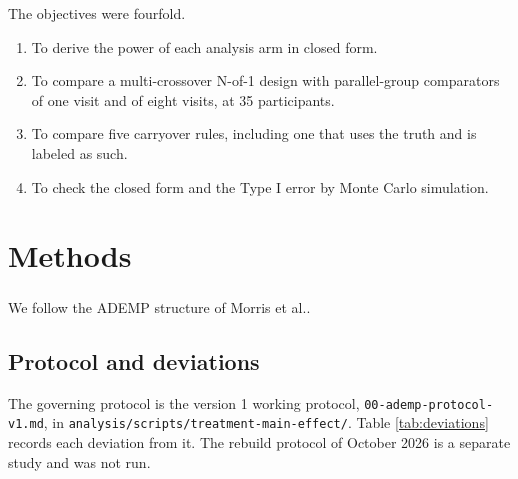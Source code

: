 \documentclass[
  11pt,
]{article}
\providecommand{\tightlist}{%
  \setlength{\itemsep}{0pt}\setlength{\parskip}{0pt}}
\begin{document}
The objectives were fourfold.

\begin{enumerate}
\def\labelenumi{\arabic{enumi}.}
\tightlist
\item
  To derive the power of each analysis arm in closed form.
\item
  To compare a multi-crossover N-of-1 design with parallel-group comparators of one visit and of eight visits, at 35 participants.
\item
  To compare five carryover rules, including one that uses the truth and is labeled as such.
\item
  To check the closed form and the Type I error by Monte Carlo simulation.
\end{enumerate}

\section{Methods}\label{methods}

We follow the ADEMP structure of Morris et al.\textsuperscript{}.

\subsection{Protocol and deviations}\label{protocol-and-deviations}

The governing protocol is the version 1 working protocol, \texttt{00-ademp-protocol-v1.md}, in \texttt{analysis/scripts/treatment-main-effect/}. Table \ref{tab:deviations} records each deviation from it. The rebuild protocol of October 2026 is a separate study and was not run.
\end{document}
